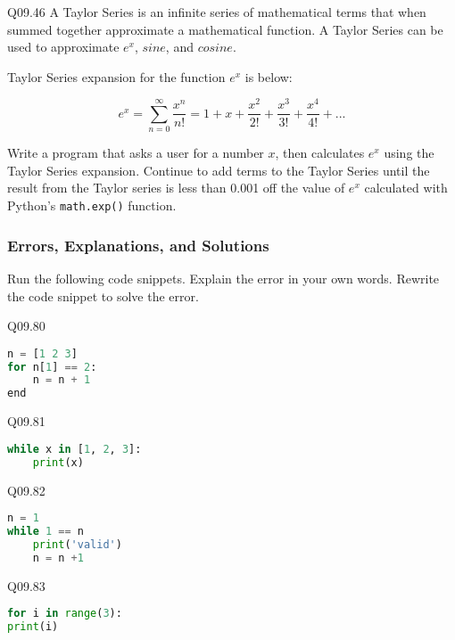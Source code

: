 \documentclass{book}
\newcommand{\passthrough}[1]{#1}
\begin{document}
Q09.46 A Taylor Series is an infinite series of mathematical terms that
when summed together approximate a mathematical function. A Taylor
Series can be used to approximate \(e^x\), \(sine\), and \(cosine\).

Taylor Series expansion for the function \(e^x\) is below:

\[  {e^x} = \sum\limits_{n = 0}^\infty  {\frac{{{x^n}}}{{n!}}}  = 1 + x + \frac{{{x^2}}}{{2!}} + \frac{{{x^3}}}{{3!}} + \frac{{{x^4}}}{{4!}} + ... \]

Write a program that asks a user for a number \(x\), then calculates
\(e^x\) using the Taylor Series expansion. Continue to add terms to the
Taylor Series until the result from the Taylor series is less than 0.001
off the value of \(e^x\) calculated with Python's
\passthrough{\lstinline!math.exp()!} function.
    




    
        \hypertarget{errors-explanations-and-solutions}{%
\subsubsection{Errors, Explanations, and
Solutions}\label{errors-explanations-and-solutions}}

Run the following code snippets. Explain the error in your own words.
Rewrite the code snippet to solve the error.
    




    
        Q09.80

\begin{lstlisting}[language=Python]
n = [1 2 3]
for n[1] == 2:
    n = n + 1
end
\end{lstlisting}

Q09.81

\begin{lstlisting}[language=Python]
while x in [1, 2, 3]:
    print(x)
\end{lstlisting}

Q09.82

\begin{lstlisting}[language=Python]
n = 1
while 1 == n
    print('valid')
    n = n +1
\end{lstlisting}

Q09.83

\begin{lstlisting}[language=Python]
for i in range(3):
print(i)
\end{lstlisting}
\end{document}
